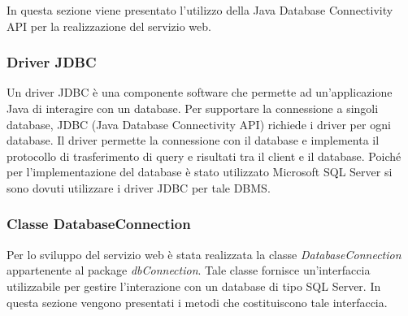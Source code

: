 In questa sezione viene presentato l'utilizzo della Java Database Connectivity API per la realizzazione del servizio web.

\subsubsection{Driver JDBC}

Un driver JDBC è una componente software che permette ad un'applicazione Java di interagire con un database. Per supportare la connessione a singoli database, JDBC (Java Database Connectivity API) richiede i driver per ogni database. Il driver permette la connessione con il database e implementa il protocollo di trasferimento di query e risultati tra il client e il database. Poiché per l'implementazione del database è stato utilizzato Microsoft SQL Server si sono dovuti utilizzare i driver JDBC per tale DBMS.

\subsubsection{Classe DatabaseConnection} \label{dbconnect}

Per lo sviluppo del servizio web è stata realizzata la classe \textit{DatabaseConnection} appartenente al package \textit{dbConnection}. Tale classe fornisce un'interfaccia utilizzabile per gestire l'interazione con un database di tipo SQL Server. In questa sezione vengono presentati i metodi che costituiscono tale interfaccia.


